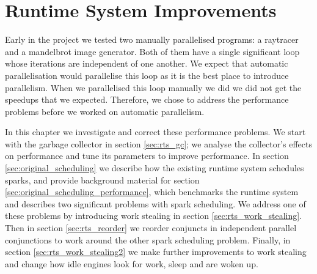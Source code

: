 
\chapter{Runtime System Improvements}
\label{chap:rts}


Early in the project
we tested two manually parallelised programs:
a raytracer and a mandelbrot image generator.
Both of them have a single significant loop
whose iterations are independent of one another.
We expect that automatic parallelisation would parallelise this loop
as it is the best place to introduce parallelism.
When we parallelised this loop manually we did
we did not get the speedups that we expected.
Therefore,
we chose to address the performance problems
before we worked on automatic parallelism.

In this chapter we investigate and correct these performance problems.
We start with the garbage collector in section \ref{sec:rts_gc};
we analyse the collector's effects on performance and tune its parameters
to improve performance.
In section \ref{sec:original_scheduling} we describe how the existing runtime
system schedules sparks,
and provide background material for
section \ref{sec:original_scheduling_performance},
which benchmarks the runtime system and describes two significant problems with
spark scheduling.
We address one of these problems by introducing work stealing in section
\ref{sec:rts_work_stealing}.
Then in section \ref{sec:rts_reorder} we reorder conjuncts in independent
parallel conjunctions to work around the other spark scheduling problem.
Finally, in section \ref{sec:rts_work_stealing2} we make further improvements to
work stealing and change how idle engines look for work, sleep and are
woken up.






%


%

